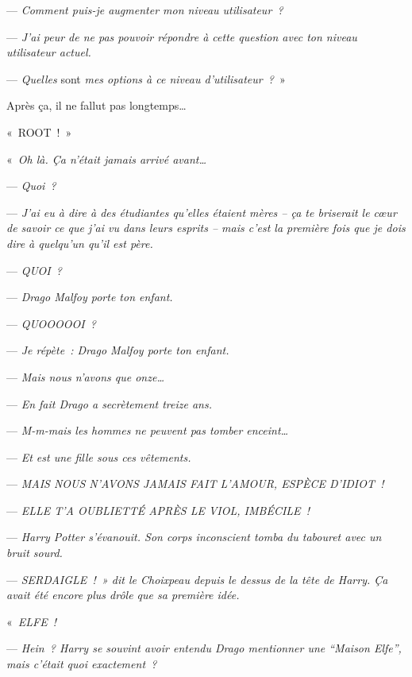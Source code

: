 --- \emph{Comment puis-je augmenter mon niveau utilisateur~?}

--- \emph{J'ai peur de ne pas pouvoir répondre à cette question avec ton niveau utilisateur actuel.}

--- \emph{Quelles} sont \emph{mes options à ce niveau d'utilisateur~?}~»

Après ça, il ne fallut pas longtemps…

«~ROOT~!~»\footnotemark
{}

\later

«~\emph{Oh là. Ça n'était jamais arrivé avant…}

--- \emph{Quoi~?}

--- \emph{J'ai eu à dire à des étudiantes qu'elles étaient mères -- ça te briserait le cœur de savoir ce que j'ai vu dans leurs esprits -- mais c'est la première fois que je dois dire à quelqu'un qu'il est père.}

--- \emph{QUOI~?}

--- \emph{Drago Malfoy porte ton enfant.}

--- \emph{QUOOOOOI~?}

--- \emph{Je répète~: Drago Malfoy porte ton enfant.}

--- \emph{Mais nous n'avons que onze…}

--- \emph{En fait Drago a secrètement treize ans.}

--- \emph{M-m-mais les hommes ne peuvent pas tomber enceint…}

--- \emph{Et est une fille sous ces vêtements.}

--- \emph{MAIS NOUS N'AVONS JAMAIS FAIT L'AMOUR, ESPÈCE D'IDIOT~!}

--- \emph{ELLE T'A OUBLIETTÉ APRÈS LE VIOL, IMBÉCILE~!}

--- \emph{Harry Potter s'évanouit. Son corps inconscient tomba du tabouret avec un bruit sourd.}

--- \emph{SERDAIGLE~!~» dit le Choixpeau depuis le dessus de la tête de Harry. Ça avait été encore plus drôle que sa première idée.}

\later

«~\emph{ELFE~!}

--- \emph{Hein~? Harry se souvint avoir entendu Drago mentionner une “Maison Elfe”, mais c'était quoi exactement~?}

